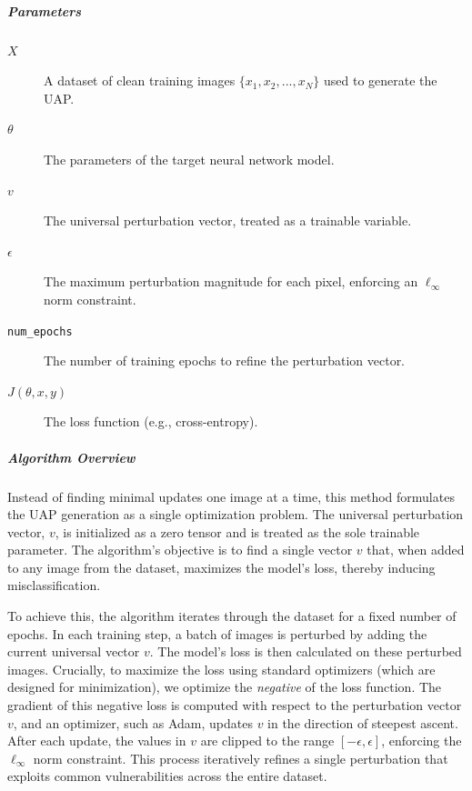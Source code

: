 \documentclass[../main.tex]{subfiles}
\begin{document}
\subparagraph{Parameters}
\begin{description}
  \item[$X$] A dataset of clean training images $\{x_1, x_2, ..., x_N\}$ used to generate the UAP.
  \item[$\theta$] The parameters of the target neural network model.
  \item[$v$] The universal perturbation vector, treated as a trainable variable.
  \item[$\epsilon$] The maximum perturbation magnitude for each pixel, enforcing an $\ell_\infty$ norm constraint.
  \item[\texttt{num\_epochs}] The number of training epochs to refine the perturbation vector.
  \item[$J(\theta, x, y)$] The loss function (e.g., cross-entropy).
\end{description}

\subparagraph{Algorithm Overview}
Instead of finding minimal updates one image at a time, this method formulates the UAP generation as a single optimization problem. The universal perturbation vector, $v$, is initialized as a zero tensor and is treated as the sole trainable parameter. The algorithm's objective is to find a single vector $v$ that, when added to any image from the dataset, maximizes the model's loss, thereby inducing misclassification.

To achieve this, the algorithm iterates through the dataset for a fixed number of epochs. In each training step, a batch of images is perturbed by adding the current universal vector $v$. The model's loss is then calculated on these perturbed images. Crucially, to maximize the loss using standard optimizers (which are designed for minimization), we optimize the \textit{negative} of the loss function. The gradient of this negative loss is computed with respect to the perturbation vector $v$, and an optimizer, such as Adam, updates $v$ in the direction of steepest ascent. After each update, the values in $v$ are clipped to the range $[-\epsilon, \epsilon]$, enforcing the $\ell_\infty$ norm constraint. This process iteratively refines a single perturbation that exploits common vulnerabilities across the entire dataset.
\end{document}
